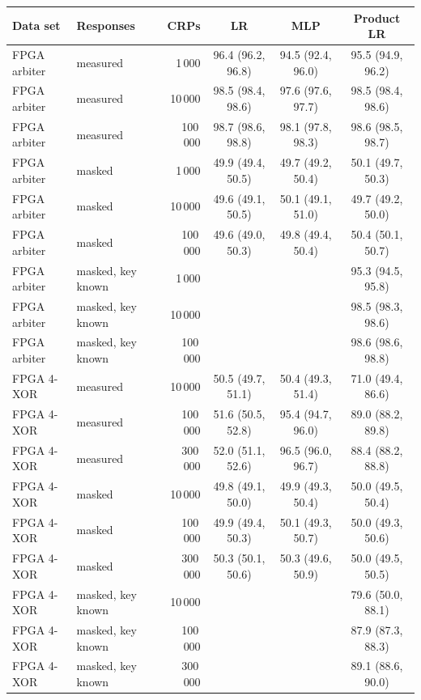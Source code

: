 \begin{tabular}{llrccc}
\toprule
Data set & Responses & CRPs & LR & MLP & Product LR \\
\midrule
FPGA arbiter & measured & 1\,000 & 96.4 (96.2, 96.8) & 94.5 (92.4, 96.0) & 95.5 (94.9, 96.2) \\
FPGA arbiter & measured & 10\,000 & 98.5 (98.4, 98.6) & 97.6 (97.6, 97.7) & 98.5 (98.4, 98.6) \\
FPGA arbiter & measured & 100\,000 & 98.7 (98.6, 98.8) & 98.1 (97.8, 98.3) & 98.6 (98.5, 98.7) \\
FPGA arbiter & masked & 1\,000 & 49.9 (49.4, 50.5) & 49.7 (49.2, 50.4) & 50.1 (49.7, 50.3) \\
FPGA arbiter & masked & 10\,000 & 49.6 (49.1, 50.5) & 50.1 (49.1, 51.0) & 49.7 (49.2, 50.0) \\
FPGA arbiter & masked & 100\,000 & 49.6 (49.0, 50.3) & 49.8 (49.4, 50.4) & 50.4 (50.1, 50.7) \\
FPGA arbiter & masked, key known & 1\,000 &  &  & 95.3 (94.5, 95.8) \\
FPGA arbiter & masked, key known & 10\,000 &  &  & 98.5 (98.3, 98.6) \\
FPGA arbiter & masked, key known & 100\,000 &  &  & 98.6 (98.6, 98.8) \\
\midrule
FPGA 4-XOR & measured & 10\,000 & 50.5 (49.7, 51.1) & 50.4 (49.3, 51.4) & 71.0 (49.4, 86.6) \\
FPGA 4-XOR & measured & 100\,000 & 51.6 (50.5, 52.8) & 95.4 (94.7, 96.0) & 89.0 (88.2, 89.8) \\
FPGA 4-XOR & measured & 300\,000 & 52.0 (51.1, 52.6) & 96.5 (96.0, 96.7) & 88.4 (88.2, 88.8) \\
FPGA 4-XOR & masked & 10\,000 & 49.8 (49.1, 50.0) & 49.9 (49.3, 50.4) & 50.0 (49.5, 50.4) \\
FPGA 4-XOR & masked & 100\,000 & 49.9 (49.4, 50.3) & 50.1 (49.3, 50.7) & 50.0 (49.3, 50.6) \\
FPGA 4-XOR & masked & 300\,000 & 50.3 (50.1, 50.6) & 50.3 (49.6, 50.9) & 50.0 (49.5, 50.5) \\
FPGA 4-XOR & masked, key known & 10\,000 &  &  & 79.6 (50.0, 88.1) \\
FPGA 4-XOR & masked, key known & 100\,000 &  &  & 87.9 (87.3, 88.3) \\
FPGA 4-XOR & masked, key known & 300\,000 &  &  & 89.1 (88.6, 90.0) \\
\bottomrule
\end{tabular}
